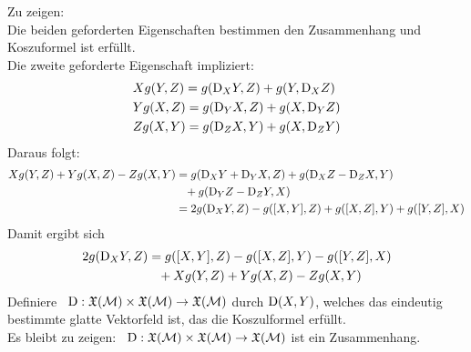 \begin{bew}
Zu zeigen:\\
Die beiden geforderten Eigenschaften bestimmen den Zusammenhang und Koszuformel ist erfüllt.\\
Die zweite geforderte Eigenschaft impliziert:
\begin{align*}
&X g(Y, Z) = g(\mathrm{D}_X Y, Z) + g(Y, \mathrm{D}_X Z)\\
&Y g(X , Z) = g (\mathrm{D}_Y X, Z) + g(X, \mathrm{D}_Y Z)\\
&Z g(X, Y) = g(\mathrm{D}_Z X, Y) + g(X, \mathrm{D}_Z Y)
\end{align*}
Daraus folgt:
\begin{align*}
X g(Y, Z) + Y g(X , Z) - Z g(X, Y) &= g(\covd_X Y + \covd_Y X, Z) + g(\covd_X Z - \covd_Z X , Y)\\
 & \phantom{=}+ g(\covd_Y Z - \covd_Z Y, X) \\
 &= 2 g(\covd_X Y, Z) - g(\comm{X}{Y}, Z) + g(\comm{X}{Z}, Y) + g(\comm{Y}{Z}, X)
\end{align*}
Damit ergibt sich
\begin{align}
2 g(\covd_X Y, Z) &= g(\comm{X}{Y}, Z) - g(\comm{X}{Z}, Y) - g(\comm{Y}{Z}, X)\\
&\phantom{=} + X g(Y, Z) + Y g(X, Z) - Z g(X, Y)
\end{align}
Definiere  \ $\mathrm{D} : \mathfrak{X}(\mathcal{M}) \times \mathfrak{X}(\mathcal{M}) \to \mathfrak{X}(\mathcal{M})$
durch $\mathrm{D} (X, Y)$, welches das eindeutig bestimmte glatte Vektorfeld ist, das die Koszulformel erfüllt.\\
Es bleibt zu zeigen: \
$\mathrm{D} : \mathfrak{X}(\mathcal{M}) \times \mathfrak{X}(\mathcal{M}) \to \mathfrak{X}(\mathcal{M}) $ ist ein Zusammenhang.


\end{bew}
